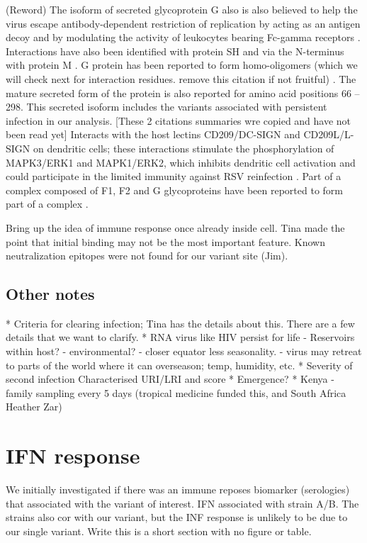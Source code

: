 \documentclass{article}
\begin{document}
(Reword) The isoform of secreted glycoprotein G also is also believed to help the virus escape antibody-dependent restriction of replication by acting as an antigen decoy and by modulating the activity of leukocytes bearing Fc-gamma receptors 
\cite{bukreyev2008secreted}.
Interactions  have also been identified with protein SH 
\cite{rixon2005respiratory} 
and via the N-terminus with protein M 
\cite{ghildyal2005interaction}.
G protein has been reported to form homo-oligomers (which we will check next for interaction residues. remove this citation if not fruitful)
\cite{collins1992oligomerization}.
The mature secreted form of the protein is also reported for amino acid positions 66 – 298.
This secreted isoform includes the variants associated with persistent infection in our analysis. 
[These 2 citations summaries wre copied and have not been read yet] Interacts with the host lectins CD209/DC-SIGN and CD209L/L-SIGN on dendritic cells; these interactions stimulate the phosphorylation of MAPK3/ERK1 and MAPK1/ERK2, which inhibits dendritic cell activation and could participate in the limited immunity against RSV reinfection 
\cite{johnson2012respiratory}.
Part of a complex composed of F1, F2 and G glycoproteins have been reported to form part of a complex
\cite{low2008rsv}.

Bring up the idea of immune response once already inside cell. 
Tina made the point that initial binding may not be the most important feature.
Known neutralization epitopes were not found for our variant site (Jim).

\subsection{Other notes}
* Criteria for clearing infection; Tina has the details about this. 
There are a few details that we want to clarify. 
* RNA virus like HIV persist for life
	- Reservoirs within host?
	- environmental?
	- closer equator less seasonality.
	- virus may retreat to parts of the world where it can overseason; temp, humidity, etc.
* Severity of second infection
	Characterised URI/LRI and score
* Emergence?
* Kenya - family sampling every 5 days (tropical medicine funded this, and South Africa Heather Zar)



\section{IFN response}

We initially investigated if there was an immune reposes biomarker (serologies) that associated with the variant of interest. 
IFN associated with strain A/B.
The strains also cor with our variant, 
but the INF response is unlikely to be due to our single variant.
Write this is a short section with no figure or table. 
\end{document}

